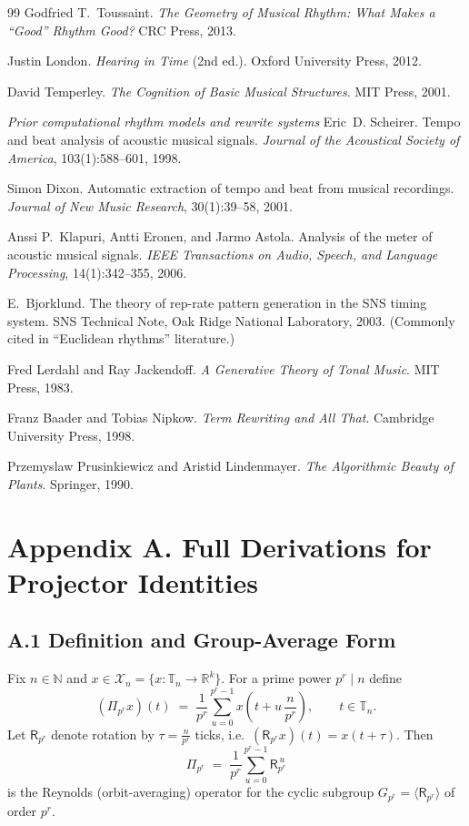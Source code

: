 \documentclass[12pt]{article}
\numberwithin{equation}{section}
\theoremstyle{plain}
\theoremstyle{definition}
\theoremstyle{remark}
\begin{document}
\begin{thebibliography}{99}
Godfried T.~Toussaint.
\newblock \emph{The Geometry of Musical Rhythm: What Makes a ``Good'' Rhythm Good?}
\newblock CRC Press, 2013.

Justin London.
\newblock \emph{Hearing in Time} (2nd ed.).
\newblock Oxford University Press, 2012.

David Temperley.
\newblock \emph{The Cognition of Basic Musical Structures}.
\newblock MIT Press, 2001.

\item[] \textit{Prior computational rhythm models and rewrite systems}
Eric~D. Scheirer.
\newblock Tempo and beat analysis of acoustic musical signals.
\newblock \emph{Journal of the Acoustical Society of America}, 103(1):588--601, 1998.

Simon Dixon.
\newblock Automatic extraction of tempo and beat from musical recordings.
\newblock \emph{Journal of New Music Research}, 30(1):39--58, 2001.

Anssi P.~Klapuri, Antti Eronen, and Jarmo Astola.
\newblock Analysis of the meter of acoustic musical signals.
\newblock \emph{IEEE Transactions on Audio, Speech, and Language Processing}, 14(1):342--355, 2006.

E.~Bjorklund.
\newblock The theory of rep-rate pattern generation in the SNS timing system.
\newblock SNS Technical Note, Oak Ridge National Laboratory, 2003. (Commonly cited in ``Euclidean rhythms'' literature.)

Fred Lerdahl and Ray Jackendoff.
\newblock \emph{A Generative Theory of Tonal Music}.
\newblock MIT Press, 1983.

Franz Baader and Tobias Nipkow.
\newblock \emph{Term Rewriting and All That}.
\newblock Cambridge University Press, 1998.

Przemyslaw Prusinkiewicz and Aristid Lindenmayer.
\newblock \emph{The Algorithmic Beauty of Plants}.
\newblock Springer, 1990.

\end{thebibliography}
\appendix
\section*{Appendix A. Full Derivations for Projector Identities}

\subsection*{A.1 Definition and Group-Average Form}
Fix $n\in\mathbb{N}$ and $x\in\mathcal{X}_n=\{x:\mathbb{T}_n\to\mathbb{R}^k\}$. For a prime power $p^r\mid n$ define
\[
(\Pi_{p^r}x)(t)\;=\;\frac{1}{p^r}\sum_{u=0}^{p^r-1}x\!\left(t+u\,\frac{n}{p^r}\right),
\qquad t\in\mathbb{T}_n.
\]
Let $\mathsf{R}_{p^r}$ denote rotation by $\tau=\frac{n}{p^r}$ ticks, i.e.\ $(\mathsf{R}_{p^r}x)(t)=x(t+\tau)$. Then
\[
\Pi_{p^r}\;=\;\frac{1}{p^r}\sum_{u=0}^{p^r-1}\mathsf{R}_{p^r}^{\,u}
\]
is the Reynolds (orbit-averaging) operator for the cyclic subgroup $G_{p^r}=\langle \mathsf{R}_{p^r}\rangle$ of order $p^r$.
\end{document}

